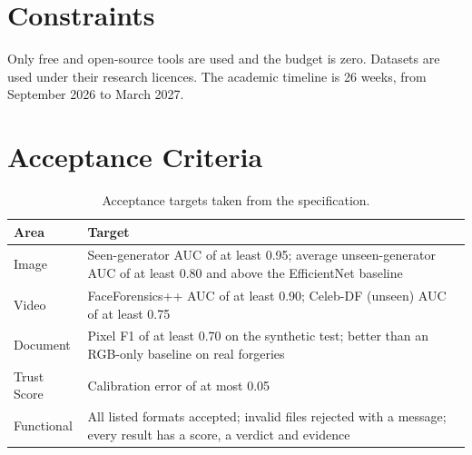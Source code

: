 \section{Constraints}
Only free and open-source tools are used and the budget is zero. Datasets are used under their research licences. The academic timeline is 26 weeks, from September 2026 to March 2027.

\section{Acceptance Criteria}
\begin{table}[htbp]
\centering\small
\caption{Acceptance targets taken from the specification.}
\begin{tabularx}{\linewidth}{@{}p{2.6cm}X@{}}
\toprule
Area & Target\\
\midrule
Image & Seen-generator AUC of at least 0.95; average unseen-generator AUC of at least 0.80 and above the EfficientNet baseline\\
Video & FaceForensics++ AUC of at least 0.90; Celeb-DF (unseen) AUC of at least 0.75\\
Document & Pixel F1 of at least 0.70 on the synthetic test; better than an RGB-only baseline on real forgeries\\
Trust Score & Calibration error of at most 0.05\\
Functional & All listed formats accepted; invalid files rejected with a message; every result has a score, a verdict and evidence\\
\bottomrule
\end{tabularx}
\end{table}

